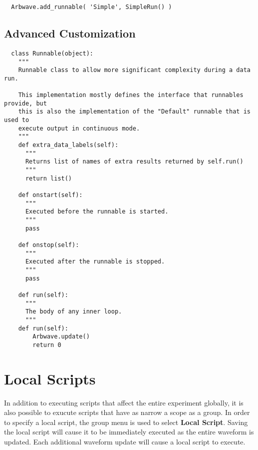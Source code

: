   \begin{lstlisting}
  Arbwave.add_runnable( 'Simple', SimpleRun() )
  \end{lstlisting}

  \subsection{Advanced Customization}

  \begin{lstlisting}
  class Runnable(object):
    """
    Runnable class to allow more significant complexity during a data run.
  
    This implementation mostly defines the interface that runnables provide, but
    this is also the implementation of the "Default" runnable that is used to
    execute output in continuous mode.
    """
    def extra_data_labels(self):
      """
      Returns list of names of extra results returned by self.run()
      """
      return list()
  
    def onstart(self):
      """
      Executed before the runnable is started.
      """
      pass
  
    def onstop(self):
      """
      Executed after the runnable is stopped.
      """
      pass
  
    def run(self):
      """
      The body of any inner loop.
      """
  	def run(self):
  		Arbwave.update()
  		return 0
  \end{lstlisting}

\section{Local Scripts}
In addition to executing scripts that affect the entire experiment globally, it
is also possible to exucute scripts that have as narrow a scope as a group.  In
order to specify a local script, the group menu is used to select \textbf{Local
Script}.  Saving the local script will cause it to be immediately executed as
the entire waveform is updated.  Each additional waveform update will cause a
local script to execute.
